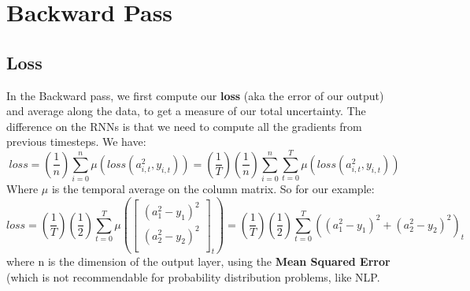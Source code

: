 \documentclass[12pt]{article}
\begin{document}
\section{Backward Pass}
\subsection{Loss}
In the Backward pass, we first compute our \textbf{loss} (aka the error of our output) and average along the data, to get a measure of our total uncertainty. The difference on the RNNs is that we need to compute all the gradients from previous timesteps. We have:
\begin{equation}
    loss = (\dfrac{1}{n}) \sum_{i=0}^{n} \mu \left( loss(a_{i,t}^{2}, y_{i,t}) \right) = (\dfrac{1}{T}) (\dfrac{1}{n}) \sum_{i=0}^{n} \sum_{t=0}^{T} \mu \left( loss(a_{i,t}^{2}, y_{i,t}) \right)
\end{equation}
Where $\mu$ is the temporal average on the column matrix. So for our example:
\begin{equation}
    loss = (\dfrac{1}{T}) (\dfrac{1}{2}) \sum_{t=0}^{T} \mu \left(
\begin{bmatrix}
(a_{1}^{2} - y_{1})^2\\
(a_{2}^{2} - y_{2})^2\\
\end{bmatrix}_{t}
\right) =
(\dfrac{1}{T}) (\dfrac{1}{2}) \sum_{t=0}^{T} \left(
(a_{1}^{2} - y_{1})^2 + (a_{2}^{2} - y_{2})^2
\right) _{t}
\end{equation}
where n is the dimension of the output layer, using the \textbf{Mean Squared Error} (which is not recommendable for probability distribution problems, like NLP.
\end{document}
